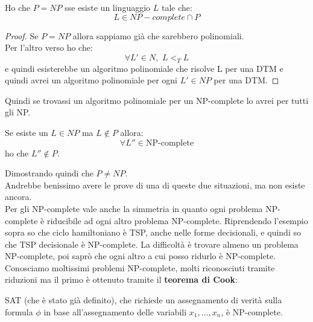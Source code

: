 \documentclass[a4paper,12pt, oneside]{book}
\begin{document}
\begin{teorema}
  Ho che $P=NP$ sse esiste un linguaggio $L$ tale che:
  \[L\in NP-complete\cap P\]
\end{teorema}
\begin{proof}
  Se $P=NP$ allora sappiamo già che sarebbero polinomiali.\\
  Per l'altro verso ho che:
  \[\forall L'\in N, \,\,L<_T L\]
  e quindi esisterebbe un algoritmo polinomiale che risolve L per una DTM e
  quindi avrei un algoritmo polinomiale per ogni $L'\in NP$ per una DTM.
\end{proof}
Quindi se trovassi un algoritmo polinomiale per un NP-complete lo avrei per
tutti gli NP.
\begin{teorema}
  Se esiste un $L\in NP$ ma $L\not\in P$ allora:
  \[\forall L''\in \mbox{NP-complete}\]
  ho che $L''\not\in P$.
\end{teorema}
Dimostrando quindi che $P\neq NP$.\\
Andrebbe benissimo avere le prove di una di queste due situazioni, ma non esiste
ancora.\\
Per gli NP-complete vale anche la simmetria in quanto ogni problema NP-complete
è riducibile ad ogni altro problema NP-complete. Riprendendo l'esempio sopra so
che ciclo hamiltoniano è TSP, anche nelle forme decisionali, e quindi so che TSP
decisionale è NP-complete. La difficoltà è trovare almeno un problema
NP-complete, poi saprò che ogni altro a cui posso ridurlo è NP-complete.\\
Conosciamo moltissimi problemi NP-complete, molti riconosciuti tramite riduzioni
ma il primo è ottenuto tramite il \textbf{teorema di Cook}:
\begin{teorema}
  SAT (che è stato già definito), che richiede un assegnamento di verità sulla
  formula $\phi$ in base all'assegnamento delle variabili $x_1,\ldots,x_n$, è
  NP-complete. 
\end{teorema}
\end{document}
